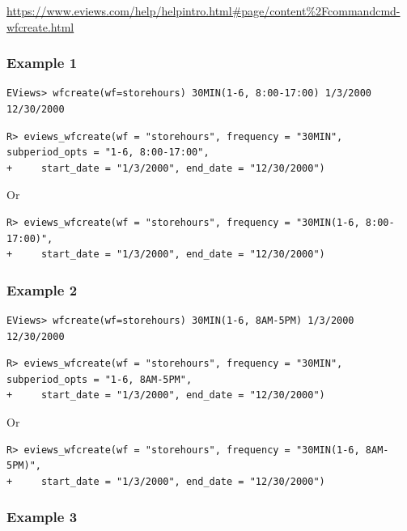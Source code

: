 \url{https://www.eviews.com/help/helpintro.html\#page/content\%2Fcommandcmd-wfcreate.html}

\hypertarget{example-1-2}{%
\subsubsection{Example 1}\label{example-1-2}}

\begin{verbatim}
EViews> wfcreate(wf=storehours) 30MIN(1-6, 8:00-17:00) 1/3/2000 12/30/2000
\end{verbatim}

\begin{verbatim}
R> eviews_wfcreate(wf = "storehours", frequency = "30MIN", subperiod_opts = "1-6, 8:00-17:00",
+     start_date = "1/3/2000", end_date = "12/30/2000")
\end{verbatim}

Or

\begin{verbatim}
R> eviews_wfcreate(wf = "storehours", frequency = "30MIN(1-6, 8:00-17:00)",
+     start_date = "1/3/2000", end_date = "12/30/2000")
\end{verbatim}

\hypertarget{example-2-2}{%
\subsubsection{Example 2}\label{example-2-2}}

\begin{verbatim}
EViews> wfcreate(wf=storehours) 30MIN(1-6, 8AM-5PM) 1/3/2000 12/30/2000
\end{verbatim}

\begin{verbatim}
R> eviews_wfcreate(wf = "storehours", frequency = "30MIN", subperiod_opts = "1-6, 8AM-5PM",
+     start_date = "1/3/2000", end_date = "12/30/2000")
\end{verbatim}

Or

\begin{verbatim}
R> eviews_wfcreate(wf = "storehours", frequency = "30MIN(1-6, 8AM-5PM)",
+     start_date = "1/3/2000", end_date = "12/30/2000")
\end{verbatim}

\hypertarget{example-3-2}{%
\subsubsection{Example 3}\label{example-3-2}}

